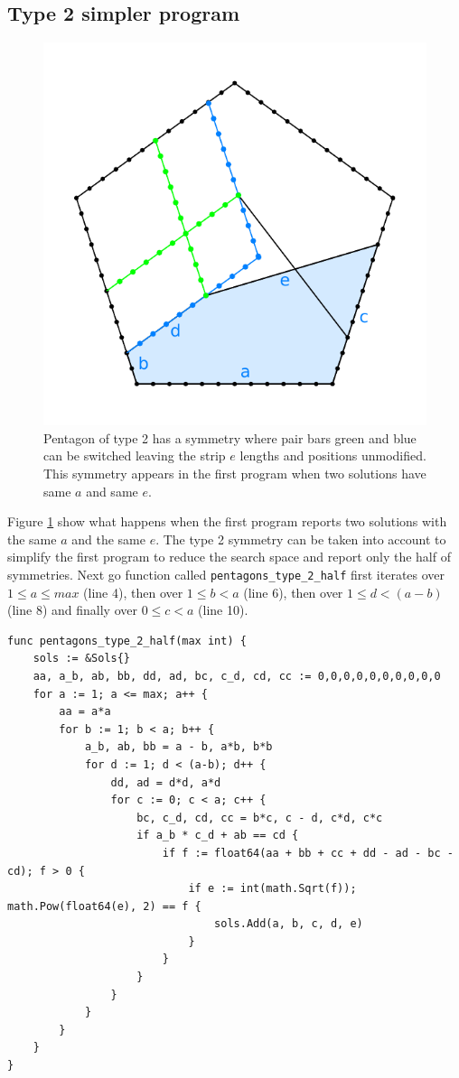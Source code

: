 \documentclass[11pt]{article}
\begin{document}
\subsection{Type 2 simpler program}

\begin{figure}[h]
\centering
\includegraphics[scale=0.75]{figs/type-2-double}
\caption{Pentagon of type 2 has a symmetry where pair bars green and blue can be switched leaving
the strip $e$ lengths and positions unmodified. This symmetry appears in the first program when two solutions have same $a$ and same $e$.}
\label{fig:type-2-double}
\end{figure}

Figure \ref{fig:type-2-double} show what happens when the first program reports
two solutions with the same $a$ and the same $e$. 
The type 2 symmetry can be taken into account to simplify the first program
to reduce the search space and report only the half of symmetries.
Next go function called \texttt{pentagons\_type\_2\_half} first iterates
over $1 \leq a \leq max$ (line 4),
then over $1 \leq b < a$ (line 6),
then over $1 \leq d < (a-b)$ (line 8)
and finally over $0 \leq c < a$ (line 10).

\begin{lstlisting}
func pentagons_type_2_half(max int) {
	sols := &Sols{}
	aa, a_b, ab, bb, dd, ad, bc, c_d, cd, cc := 0,0,0,0,0,0,0,0,0,0
	for a := 1; a <= max; a++ {
		aa = a*a
		for b := 1; b < a; b++ {
			a_b, ab, bb = a - b, a*b, b*b
			for d := 1; d < (a-b); d++ {
				dd, ad = d*d, a*d
				for c := 0; c < a; c++ {
					bc, c_d, cd, cc = b*c, c - d, c*d, c*c
					if a_b * c_d + ab == cd {
						if f := float64(aa + bb + cc + dd - ad - bc - cd); f > 0 {
							if e := int(math.Sqrt(f)); math.Pow(float64(e), 2) == f {
								sols.Add(a, b, c, d, e)
							}
						}
					}
				}
			}
		}
	}
}
\end{lstlisting}
\end{document}
